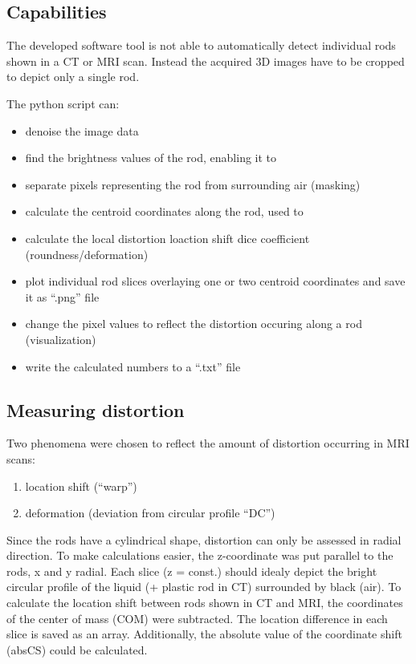 \documentclass[parskip,bibtotoc,final,twoside=false,titlepage,a4paper,english,12pt,titlepage,a4paper]{scrbook}
\begin{document}
\subsection{Capabilities}

The developed software tool is not able to automatically detect individual rods shown in a CT or MRI scan.
Instead the acquired 3D images have to be cropped to depict only a single rod.

The python script can:
\begin{itemize}
 \item denoise the image data
 \item find the brightness values of the rod, enabling it to
 \item separate pixels representing the rod from surrounding air (masking)
 \item calculate the centroid coordinates along the rod, used to
 \item calculate the local distortion
  \subitem loaction shift
  \subitem dice coefficient (roundness/deformation)
 \item plot individual rod slices
  \subitem overlaying one or two centroid coordinates
  \subitem and save it as ``.png'' file
 \item change the pixel values to reflect the distortion occuring along a rod (visualization)
 \item write the calculated numbers to a ``.txt'' file
\end{itemize}

\subsection{Measuring distortion}

Two phenomena were chosen to reflect the amount of distortion occurring in MRI scans:

\begin{enumerate}[label=\textbf{\arabic*)}]
 \item location shift (``warp'')
 \item deformation (deviation from circular profile ``DC'')
\end{enumerate}

Since the rods have a cylindrical shape, distortion can only be assessed in radial direction. To make calculations easier, the z-coordinate was put parallel to the rods, x and y radial.
Each slice (z = const.) should idealy depict the bright circular profile of the liquid (+ plastic rod in CT) surrounded by black (air).
To calculate the location shift between rods shown in CT and MRI, the coordinates of the center of mass (COM) were subtracted.
The location difference in each slice is saved as an array. Additionally, the absolute value of the coordinate shift (absCS) could be calculated.
\end{document}
